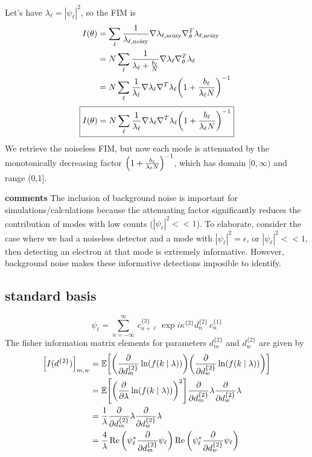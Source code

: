 \documentclass[12pt]{article}
\begin{document}
Let's have $\lambda_\ell = |\psi_\ell|^2$, so the FIM is
\begin{align*}
    I(\theta) &= \sum_{\ell}
    \frac{1}{\lambda_{\ell, \text{noisy}}} \nabla \lambda_{\ell, \text{noisy}} \nabla_\theta^T \lambda_{\ell, \text{noisy}}\\
    &= N\sum_{\ell} \frac{1}{\lambda_\ell + \frac{b_\ell}{N}} \nabla \lambda_\ell \nabla_\theta^T \lambda_\ell\\
    &= N\sum_{\ell} \frac{1}{\lambda_\ell} \nabla \lambda_\ell \nabla^T \lambda_\ell 
        \qty(1 + \frac{b_\ell}{\lambda_\ell N})^{-1}\\
\end{align*}
\begin{equation*}
    \boxed{
    I(\theta) = N\sum_{\ell} 
    \frac{1}{\lambda_\ell} \nabla \lambda_\ell \nabla^T \lambda_\ell 
        \qty(1 + \frac{b_\ell}{\lambda_\ell N})^{-1}
    }
\end{equation*}
We retrieve the noiseless FIM, but now each mode is attenuated by the 
monotonically decreasing factor $\qty(1 + \frac{b_\ell}{\lambda_\ell N})^{-1}$, 
which has domain $[0,\infty)$ and range (0,1].

\textbf{comments} The inclusion of background noise is important for simulations/calculations because the 
attenuating factor significantly reduces the contribution of modes with low counts ($|\psi_\ell|^2<<1$). 
To elaborate, consider the case where we had a noiseless detector and a mode with $|\psi_\ell|^2=\epsilon$, 
or $|\psi_\ell|^2<<1$, then detecting an electron at that mode is extremely informative. However, background 
noise makes these informative detections imposible to identify.

    

\subsection{standard basis}
\begin{equation*}
    \psi_\ell = 
    \sum_{n=-\infty}^{\infty} \,
     c^{\{3\}}_{n + \ell} \,
        \exp{i \kappa^{\{2\}} d^{\{2\}}_n} \,
        c^{\{1\}}_n 
\end{equation*}
The fisher information matrix elements for parameters $d^{\{2\}}_m$ and $d^{\{2\}}_w$ are given by
\begin{align*}
    \qty[I(d^{\{2\}})]_{m,w} &= 
    \mathbb{E}\qty[
        \qty(\pdv{d^{\{2\}}_m} \ln(f(k\mid \lambda)))
        \qty(\pdv{d^{\{2\}}_w} \ln(f(k\mid \lambda)))
        ] \\
    &= \mathbb{E}\qty[
        \qty(\pdv{\lambda} \ln(f(k\mid \lambda)))^2 
        ] \pdv{d^{\{2\}}_m} \lambda \pdv{d^{\{2\}}_w} \lambda  \\
    &= \frac{1}{\lambda} \pdv{d^{\{2\}}_m} \lambda \pdv{d^{\{2\}}_w} \lambda \\
    &= \frac{4}{\lambda} \Re\qty(\psi_\ell^* \pdv{d^{\{2\}}_m} \psi_\ell)
        \Re\qty(\psi_\ell^* \pdv{d^{\{2\}}_w} \psi_\ell)
\end{align*}
\end{document}
